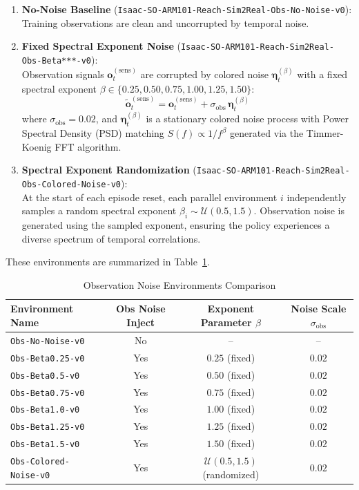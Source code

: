 \begin{enumerate}
    \item \textbf{No-Noise Baseline} (\texttt{Isaac-SO-ARM101-Reach-Sim2Real-Obs-No-Noise-v0}): \\
    Training observations are clean and uncorrupted by temporal noise.

    \item \textbf{Fixed Spectral Exponent Noise} (\texttt{Isaac-SO-ARM101-Reach-Sim2Real-Obs-Beta***-v0}): \\
    Observation signals $\boldsymbol{o}_t^{(\mathrm{sens})}$ are corrupted by colored noise $\boldsymbol{\eta}_t^{(\beta)}$ with a fixed spectral exponent $\beta \in \{0.25, 0.50, 0.75, 1.00, 1.25, 1.50\}$:
    \begin{equation}
        \tilde{\boldsymbol{o}}_t^{(\mathrm{sens})} = \boldsymbol{o}_t^{(\mathrm{sens})} + \sigma_{\mathrm{obs}} \, \boldsymbol{\eta}_t^{(\beta)}
    \end{equation}
    where $\sigma_{\mathrm{obs}} = 0.02$, and $\boldsymbol{\eta}_t^{(\beta)}$ is a stationary colored noise process with Power Spectral Density (PSD) matching $S(f) \propto 1/f^{\beta}$ generated via the Timmer-Koenig FFT algorithm.

    \item \textbf{Spectral Exponent Randomization} (\texttt{Isaac-SO-ARM101-Reach-Sim2Real-Obs-Colored-Noise-v0}): \\
    At the start of each episode reset, each parallel environment $i$ independently samples a random spectral exponent $\beta_i \sim \mathcal{U}(0.5, 1.5)$. Observation noise is generated using the sampled exponent, ensuring the policy experiences a diverse spectrum of temporal correlations.
\end{enumerate}

These environments are summarized in Table~\ref{tab:noise_scenarios}.

\begin{table}[htbp]
  \centering
  \caption{Observation Noise Environments Comparison}
  \label{tab:noise_scenarios}
  \begin{tabular}{lccc}
    \toprule
    Environment Name & Obs Noise Inject & Exponent Parameter $\beta$ & Noise Scale $\sigma_{\mathrm{obs}}$ \\
    \midrule
    \texttt{Obs-No-Noise-v0} & No & -- & -- \\
    \texttt{Obs-Beta0.25-v0} & Yes & $0.25$ (fixed) & $0.02$ \\
    \texttt{Obs-Beta0.5-v0} & Yes & $0.50$ (fixed) & $0.02$ \\
    \texttt{Obs-Beta0.75-v0} & Yes & $0.75$ (fixed) & $0.02$ \\
    \texttt{Obs-Beta1.0-v0} & Yes & $1.00$ (fixed) & $0.02$ \\
    \texttt{Obs-Beta1.25-v0} & Yes & $1.25$ (fixed) & $0.02$ \\
    \texttt{Obs-Beta1.5-v0} & Yes & $1.50$ (fixed) & $0.02$ \\
    \texttt{Obs-Colored-Noise-v0} & Yes & $\boldsymbol{\mathcal{U}(0.5, 1.5)}$ (randomized) & $0.02$ \\
    \bottomrule
  \end{tabular}
\end{table}
